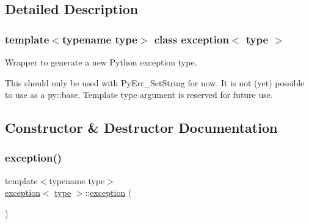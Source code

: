 \subsection{Detailed Description}
\subsubsection*{template$<$typename type$>$\newline
class exception$<$ type $>$}

Wrapper to generate a new Python exception type.

This should only be used with Py\+Err\+\_\+\+Set\+String for now. It is not (yet) possible to use as a py\+::base. Template type argument is reserved for future use. 

\subsection{Constructor \& Destructor Documentation}
\mbox{\label{classexception_a54c9f127e402c9656e66514d1a977448}} 
\subsubsection{\texorpdfstring{exception()}{exception()}\hspace{0.1cm}{\footnotesize\ttfamily [1/2]}}
{\footnotesize\ttfamily template$<$typename type$>$ \\
\mbox{\hyperlink{classexception}{exception}}$<$ \mbox{\hyperlink{_s_d_l__opengl_8h_ad5ddf6fca7b585646515660e810e0188}{type}} $>$\+::\mbox{\hyperlink{classexception}{exception}} (\begin{DoxyParamCaption}{ }\end{DoxyParamCaption})\hspace{0.3cm}{\ttfamily [default]}}

\mbox{\label{classexception_a34fc75a5802151fdc02549ad85f81b7f}} 
